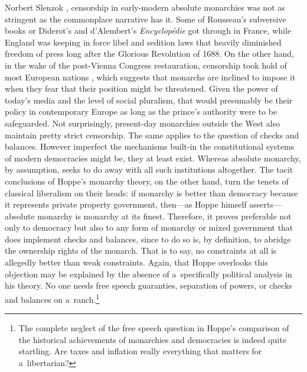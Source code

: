 \begin{artengenv}{Norbert Slenzok}
{%
\parencite*[][pp.114–117]{henshall_myth_2013}, %
 censorship in early-modern absolute monarchies was not as stringent as the commonplace narrative has it. Some of Rousseau's subversive books or Diderot's and d'Alembert's \textit{Encyclopédie} got through in France, while England was keeping in force libel and sedition laws that heavily diminished freedom of press long after the Glorious Revolution of 1688. On the other hand, in the wake of the post-Vienna Congress restauration, censorship took hold of most European nations 
\parencite[][p.208]{henshall_myth_2013}, %
 which suggests that monarchs are inclined to impose it when they fear that their position might be threatened. Given the power of today's media and the level of social pluralism, that would presumably be their policy in contemporary Europe as long as the prince's authority were to be safeguarded. Not surprisingly, present-day monarchies outside the West also maintain pretty strict censorship. } The same applies to the question of checks and balances. However imperfect the mechanisms built-in the constitutional systems of modern democracies might be, they at least exist. Whereas absolute monarchy, by assumption, seeks to do away with all such institutions altogether. The tacit conclusions of Hoppe's monarchy theory, on the other hand, turn the tenets of classical liberalism on their heads: if monarchy is better than democracy because it represents private property government, then---as Hoppe 
\parencite*[][f.9]{hoppe_democracy_2007} %
 himself asserts--- absolute monarchy is monarchy at its finest. Therefore, it proves preferable not only to democracy but also to any form of monarchy or mixed government that does implement checks and balances, since to do so is, by definition, to abridge the ownership rights of the monarch. That is to say, no constraints at all is allegedly better than weak constraints. Again, that Hoppe overlooks this objection may be explained by the absence of a~specifically political analysis in his theory. No one needs free speech guaranties, separation of powers, or checks and balances on a~ranch.\footnote{The complete neglect of the free speech question in Hoppe's 
\parencite*[][pp.50–62]{hoppe_democracy_2007} %
 comparison of the historical achievements of monarchies and democracies is indeed quite startling. Are taxes and inflation really everything that matters for a~libertarian? }




\end{artengenv}
